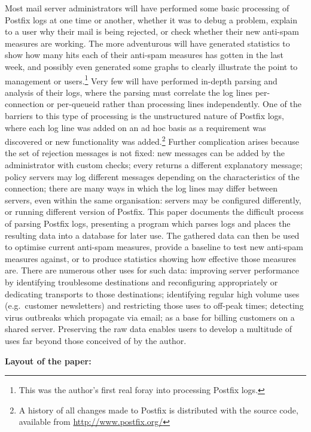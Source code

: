 \documentclass[a4paper,12pt,draft]{article}
\begin{document}
Most mail server administrators will have performed some basic processing
of Postfix logs at one time or another, whether it was to debug a problem,
explain to a user why their mail is being rejected, or check whether their
new anti-spam measures are working.  The more adventurous will have
generated statistics to show how many hits each of their anti-spam measures
has gotten in the last week, and possibly even generated some graphs to
clearly illustrate the point to management or users.\footnote{This was the
author's first real foray into processing Postfix logs.}  Very few will
have performed in-depth parsing and analysis of their logs, where the
parsing must correlate the log lines per-connection or per-queueid rather
than processing lines independently.  One of the barriers to this type of
processing is the unstructured nature of Postfix logs, where each log line
was added on an ad hoc basis as a requirement was discovered or new
functionality was added.\footnote{A history of all changes made to Postfix
is distributed with the source code, available from
\url{http://www.postfix.org/}} Further complication arises because the set
of rejection messages is not fixed: new messages can be added by the
administrator with custom checks; every \RBL{} returns a different
explanatory message; policy servers may log different messages depending on
the characteristics of the connection; there are many ways in which the log
lines may differ between servers, even within the same organisation:
servers may be configured differently, or running different version of
Postfix.  This paper documents the difficult process of parsing Postfix
logs, presenting a program which parses logs and places the resulting data
into a database for later use.  The gathered data can then be used to
optimise current anti-spam measures, provide a baseline to test new
anti-spam measures against, or to produce statistics showing how effective
those measures are.  There are numerous other uses for such data: improving
server performance by identifying troublesome destinations and
reconfiguring appropriately or dedicating transports to those destinations;
identifying regular high volume uses (e.g.\ customer newsletters) and
restricting those uses to off-peak times; detecting virus outbreaks which
propagate via email; as a base for billing customers on a shared server.
Preserving the raw data enables users to develop a multitude of uses far
beyond those conceived of by the author.

\vspace{1em}\noindent\textbf{Layout of the paper:}
\end{document}
